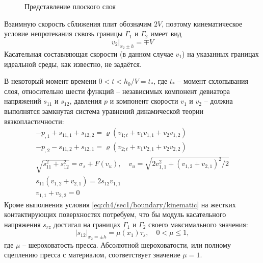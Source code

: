 \begin{figure}[ht]
  \caption{Представление плоского слоя}
  \label{fig:ch4/layer/circle}
\end{figure}
Взаимную скорость сближения плит обозначим $2V$, поэтому кинематическое условие непротекания сквозь границы $\Gamma_{1}$ и $\Gamma_{2}$ имеет вид
\begin{equation}
  \label{eq:ch4/sec1/boundary/kinematic}
  v_{2}\lvert_{x_2\pm h} = \mp V
\end{equation}
Касательная составляющая скорости (в данном случае $v_{1}$) на указанных границах идеальной среды, как известно, не задаётся.

В некоторый момент времени $0 < t < h_{0}/V = t_*$, где $t_*$ -- момент схлопывания слоя, относительно шести функций -- независимых компонент девиатора напряжений $s_{11}$ и $s_{12}$, давления $p$ и компонент скорости $v_{1}$ и $v_{2}$ -- должна выполнятся замкнутая система уравнений динамической теории вязкопластичности:
\begin{subequations}
  \label{eqs:ch4/sec1/general}
  \begin{gather}
    \label{eqs:ch4/sec1/general/motion:1}
    -p_{,1}+s_{11,1}+s_{12,2} = \varrho \left(v_{1;t}+v_{1} v_{1,1} + v_{2} v_{1,2} \right)
    \\
    \label{eqs:ch4/sec1/general/motion:2}
    -p_{,2}-s_{11,2}+s_{12,1} = \varrho \left(v_{2;t}+v_{1} v_{2,1} + v_{2} v_{2,2} \right)
    \\
    \label{eqs:ch4/sec1/general/plasticity}
    \sqrt{s^2_{11}+s^2_{12}}=\sigma_{s} + F(v_{u}), \quad v_{u} = \sqrt{2 v^2_{1,1}+\left(v_{1,2}+v_{2,1}\right)^2 / 2}
    \\
    \label{eqs:ch4/sec1/general/coax}
    s_{11} \left(v_{1,2}+v_{2,1}\right) = 2 s_{12} v_{1,1}
    \\
    \label{eqs:ch4/sec1/general/uncompress}
    v_{1,1}+v_{2,2} = 0
  \end{gather}
\end{subequations}
Кроме выполнения условия \cref{eq:ch4/sec1/boundary/kinematic} на жестких контактирующих поверхностях потребуем, что бы модуль касательного напряжения $s_{rz}$ достигал на границах $\Gamma_{1}$ и $\Gamma_{2}$ своего максимального значения:
\begin{equation}
  \label{eq:ch4/sec1/boundary/force}
  \lvert s_{12}\lvert_{x_2=\pm h} = \mu(x_1) \tau_{s}, \quad 0 < \mu \le 1,
\end{equation}
где $\mu$ -- шероховатость пресса. Абсолютной шероховатости, или полному сцеплению пресса с материалом, соответствует значение $\mu = 1$.

